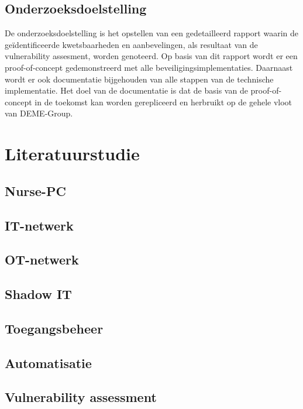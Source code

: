\subsection{Onderzoeksdoelstelling}
De onderzoeksdoelstelling is het opstellen van een gedetailleerd rapport waarin de geïdentificeerde kwetsbaarheden en aanbevelingen, als resultaat van de vulnerability assesment, worden genoteerd.
Op basis van dit rapport wordt er een proof-of-concept gedemonstreerd met alle beveiligingsimplementaties.
Daarnaast wordt er ook documentatie bijgehouden van alle stappen van de technische implementatie.
Het doel van de documentatie is dat de basis van de proof-of-concept in de toekomst kan worden gerepliceerd en herbruikt op de gehele vloot van DEME-Group.



\section{Literatuurstudie}%
\label{sec:literatuurstudie}
\subsection{Nurse-PC}
\subsection{IT-netwerk}
\subsection{OT-netwerk}
\subsection{Shadow IT}
\subsection{Toegangsbeheer}
\subsection{Automatisatie}
\subsection{Vulnerability assessment}


